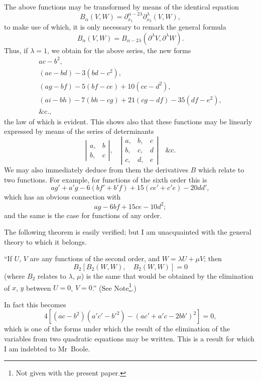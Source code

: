 \documentclass[11pt,a4paper]{article}
\theoremstyle{plain}
\theoremstyle{definition}
\theoremstyle{remark}
\begin{document}
\newpage
The above functions may be transformed by means of the identical equation
\[
B_{\alpha}(V, W) = \partial_{x_1}^{\alpha-2\lambda} \partial_{x_2}^{\lambda} (V, W),
\]
to make use of which, it is only necessary to remark the general formula
\[
B_{\alpha}(V, W) = B_{\alpha - 2\lambda}(\partial^{\lambda} V, \partial^{\lambda} W).
\]
Thus, if $\lambda=1$, we obtain for the above series, the new forms
\begin{align*}
ac - b^2, \\
(ae - bd) - 3(bd - c^2), \\
(ag - bf) - 5(bf - ce) + 10(ce - d^2), \\
(ai - bh) - 7(bh - cg) + 21(cg - df) - 35(df - e^2), \\
\&\text{c.},
\end{align*}
the law of which is evident. This shows also that these functions may be linearly
expressed by means of the series of determinants
\[
\left|\begin{array}{cc}
a, & b \\
b, & c
\end{array}\right|, \quad
\left|\begin{array}{ccc}
a, & b, & c \\
b, & c, & d \\
c, & d, & e
\end{array}\right|
\quad \&\text{c.}
\]
We may also immediately deduce from them the derivatives $B$ which relate to two
functions. For example, for functions of the sixth order this is
\[
ag' + a'g - 6(bf' + b'f) + 15(ce' + c'e) - 20dd',
\]
which has an obvious connection with
\[
ag - 6bf + 15ce - 10d^2;
\]
and the same is the case for functions of any order.

The following theorem is easily verified; but I am unacquainted with the general
theory to which it belongs.

``If $U$, $V$ are any functions of the second order, and $W = \lambda U + \mu V$; then
\[
B_2[B_2(W, W), \quad B_2(W, W)] = 0
\]
(where $B_2$ relates to $\lambda$, $\mu$) is the same that would be obtained by the elimination of
$x$, $y$ between $U=0$, $V=0$.'' (See Note\footnote{Not given with the present paper.}.)

In fact this becomes
\[
4[(ac - b^2)(a'c' - b'^2) - (ac' + a'c - 2bb')^2] = 0,
\]
which is one of the forms under which the result of the elimination of the variables
from two quadratic equations may be written. This is a result for which I am
indebted to Mr~Boole.
\end{document}
